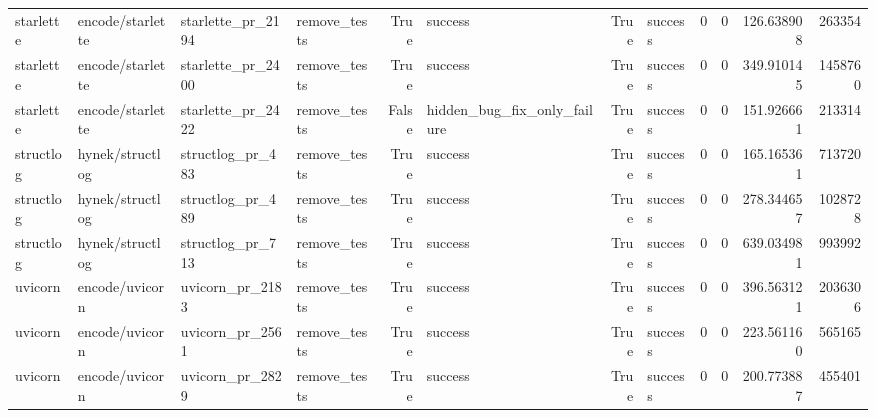 \begin{tabular}{llllrlrlrrrr}
starlette & encode/starlette & starlette\_pr\_2194 & remove\_tests & True & success & True & success & 0 & 0 & 126.638908 & 263354 \\
starlette & encode/starlette & starlette\_pr\_2400 & remove\_tests & True & success & True & success & 0 & 0 & 349.910145 & 1458760 \\
starlette & encode/starlette & starlette\_pr\_2422 & remove\_tests & False & hidden\_bug\_fix\_only\_failure & True & success & 0 & 0 & 151.926661 & 213314 \\
structlog & hynek/structlog & structlog\_pr\_483 & remove\_tests & True & success & True & success & 0 & 0 & 165.165361 & 713720 \\
structlog & hynek/structlog & structlog\_pr\_489 & remove\_tests & True & success & True & success & 0 & 0 & 278.344657 & 1028728 \\
structlog & hynek/structlog & structlog\_pr\_713 & remove\_tests & True & success & True & success & 0 & 0 & 639.034981 & 993992 \\
uvicorn & encode/uvicorn & uvicorn\_pr\_2183 & remove\_tests & True & success & True & success & 0 & 0 & 396.563121 & 2036306 \\
uvicorn & encode/uvicorn & uvicorn\_pr\_2561 & remove\_tests & True & success & True & success & 0 & 0 & 223.561160 & 565165 \\
uvicorn & encode/uvicorn & uvicorn\_pr\_2829 & remove\_tests & True & success & True & success & 0 & 0 & 200.773887 & 455401 \\
\bottomrule
\end{tabular}
